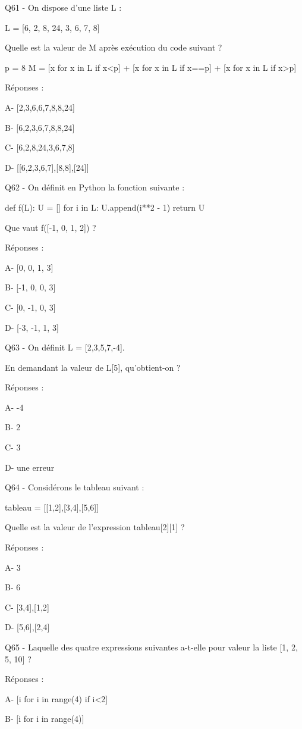 \documentclass[
]{book}
\begin{document}
Q61 - On dispose d'une liste L :

L = {[}6, 2, 8, 24, 3, 6, 7, 8{]}

Quelle est la valeur de M après exécution du code suivant ?

p = 8
M = {[}x for x in L if x\textless p{]} + {[}x for x in L if x==p{]} + {[}x for x in L if x\textgreater p{]}

Réponses :

A- {[}2,3,6,6,7,8,8,24{]}

B- {[}6,2,3,6,7,8,8,24{]}

C- {[}6,2,8,24,3,6,7,8{]}

D- {[}{[}6,2,3,6,7{]},{[}8,8{]},{[}24{]}{]}

Q62 - On définit en Python la fonction suivante :

def f(L):
U = {[}{]}
for i in L:
U.append(i**2 - 1)
return U

Que vaut f({[}-1, 0, 1, 2{]}) ?

Réponses :

A- {[}0, 0, 1, 3{]}

B- {[}-1, 0, 0, 3{]}

C- {[}0, -1, 0, 3{]}

D- {[}-3, -1, 1, 3{]}

Q63 - On définit L = {[}2,3,5,7,-4{]}.

En demandant la valeur de L{[}5{]}, qu'obtient-on ?

Réponses :

A- -4

B- 2

C- 3

D- une erreur

Q64 - Considérons le tableau suivant :

tableau = {[}{[}1,2{]},{[}3,4{]},{[}5,6{]}{]}

Quelle est la valeur de l'expression tableau{[}2{]}{[}1{]} ?

Réponses :

A- 3

B- 6

C- {[}3,4{]},{[}1,2{]}

D- {[}5,6{]},{[}2,4{]}

Q65 - Laquelle des quatre expressions suivantes a-t-elle pour valeur la liste {[}1, 2, 5, 10{]} ?

Réponses :

A- {[}i for i in range(4) if i\textless2{]}

B- {[}i for i in range(4){]}
\end{document}
